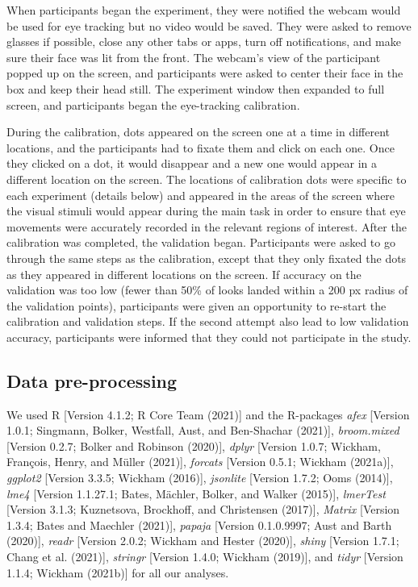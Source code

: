 \documentclass[
  english,
  man,floatsintext]{apa6}
\begin{document}
When participants began the experiment, they were notified the webcam would be used for eye tracking but no video would be saved. They were asked to remove glasses if possible, close any other tabs or apps, turn off notifications, and make sure their face was lit from the front. The webcam's view of the participant popped up on the screen, and participants were asked to center their face in the box and keep their head still. The experiment window then expanded to full screen, and participants began the eye-tracking calibration.

During the calibration, dots appeared on the screen one at a time in different locations, and the participants had to fixate them and click on each one. Once they clicked on a dot, it would disappear and a new one would appear in a different location on the screen. The locations of calibration dots were specific to each experiment (details below) and appeared in the areas of the screen where the visual stimuli would appear during the main task in order to ensure that eye movements were accurately recorded in the relevant regions of interest. After the calibration was completed, the validation began. Participants were asked to go through the same steps as the calibration, except that they only fixated the dots as they appeared in different locations on the screen. If accuracy on the validation was too low (fewer than 50\% of looks landed within a 200 px radius of the validation points), participants were given an opportunity to re-start the calibration and validation steps. If the second attempt also lead to low validation accuracy, participants were informed that they could not participate in the study.

\hypertarget{data-pre-processing}{%
\subsection{Data pre-processing}\label{data-pre-processing}}

We used R {[}Version 4.1.2; R Core Team (2021){]} and the R-packages \emph{afex} {[}Version 1.0.1; Singmann, Bolker, Westfall, Aust, and Ben-Shachar (2021){]}, \emph{broom.mixed} {[}Version 0.2.7; Bolker and Robinson (2020){]}, \emph{dplyr} {[}Version 1.0.7; Wickham, François, Henry, and Müller (2021){]}, \emph{forcats} {[}Version 0.5.1; Wickham (2021a){]}, \emph{ggplot2} {[}Version 3.3.5; Wickham (2016){]}, \emph{jsonlite} {[}Version 1.7.2; Ooms (2014){]}, \emph{lme4} {[}Version 1.1.27.1; Bates, Mächler, Bolker, and Walker (2015){]}, \emph{lmerTest} {[}Version 3.1.3; Kuznetsova, Brockhoff, and Christensen (2017){]}, \emph{Matrix} {[}Version 1.3.4; Bates and Maechler (2021){]}, \emph{papaja} {[}Version 0.1.0.9997; Aust and Barth (2020){]}, \emph{readr} {[}Version 2.0.2; Wickham and Hester (2020){]}, \emph{shiny} {[}Version 1.7.1; Chang et al. (2021){]}, \emph{stringr} {[}Version 1.4.0; Wickham (2019){]}, and \emph{tidyr} {[}Version 1.1.4; Wickham (2021b){]} for all our analyses.
\end{document}
